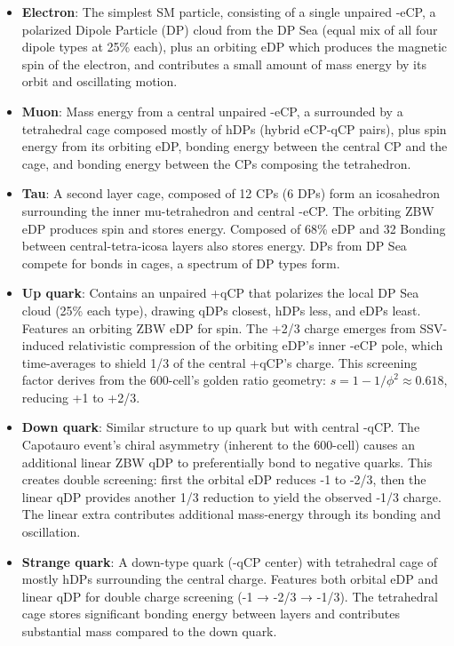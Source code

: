 \documentclass{article}
\begin{document}
\begin{itemize}
\item \textbf{Electron}: The simplest SM particle, consisting of a single unpaired -eCP, a polarized Dipole Particle (DP) cloud from the DP Sea (equal mix of all four dipole types at 25\% each), plus an orbiting eDP which produces the magnetic spin of the electron, and contributes a small amount of mass energy by its orbit and oscillating motion.

\item \textbf{Muon}: Mass energy from a central unpaired -eCP, a  surrounded by a tetrahedral cage composed mostly of hDPs (hybrid eCP-qCP pairs), plus spin energy from its orbiting eDP, bonding energy between the central CP and the cage, and bonding energy between the CPs composing the tetrahedron.

\item \textbf{Tau}: A second layer cage, composed of 12 CPs (6 DPs) form an icosahedron surrounding the inner mu-tetrahedron and central -eCP. The orbiting ZBW eDP produces spin and stores energy. Composed of 68\% eDP and 32 Bonding between central-tetra-icosa layers also stores energy. DPs from DP Sea compete for bonds in cages, a spectrum of DP types form.

\item \textbf{Up quark}: Contains an unpaired +qCP that polarizes the local DP Sea cloud (25\% each type), drawing qDPs closest, hDPs less, and eDPs least. Features an orbiting ZBW eDP for spin. The +2/3 charge emerges from SSV-induced relativistic compression of the orbiting eDP's inner -eCP pole, which time-averages to shield 1/3 of the central +qCP's charge. This screening factor derives from the 600-cell's golden ratio geometry: $s = 1 - 1/\phi^2 \approx 0.618$, reducing +1 to +2/3.

\item \textbf{Down quark}: Similar structure to up quark but with central -qCP. The Capotauro event's chiral asymmetry (inherent to the 600-cell) causes an additional linear ZBW qDP to preferentially bond to negative quarks. This creates double screening: first the orbital eDP reduces -1 to -2/3, then the linear qDP provides another 1/3 reduction to yield the observed -1/3 charge. The linear extra contributes additional mass-energy through its bonding and oscillation.

\item \textbf{Strange quark}: A down-type quark (-qCP center) with tetrahedral cage of mostly hDPs surrounding the central charge. Features both orbital eDP and linear qDP for double charge screening (-1 → -2/3 → -1/3). The tetrahedral cage stores significant bonding energy between layers and contributes substantial mass compared to the down quark.


\end{itemize}
\end{document}
